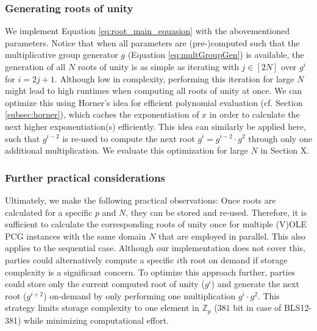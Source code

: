 \subsubsection{Generating roots of unity}
We implement Equation \ref{eq:root_main_equasion} with the abovementioned parameters. Notice that when all parameters are (pre-)computed such that the multiplicative group generator $g$ (Equation \ref{eq:multGroupGen}) is available, the generation of all $N$ roots of unity is as simple as iterating with $j\in[2N]$ over $g^i$ for $i=2j+1$. Although low in complexity, performing this iteration for large $N$ might lead to high runtimes when computing all roots of unity at once. We can optimize this using Horner's idea for efficient polynomial evaluation (cf. Section \ref{subsec:horner}), which caches the exponentiation of $x$ in order to calculate the next higher exponentiation(s) efficiently. This idea can similarly be applied here, such that $g^{i-2}$ is re-used to compute the next root $g^i= g^{i-2}\cdot g^2$ through only one additional multiplication. We evaluate this optimization for large $N$ in Section X.

\subsubsection{Further practical considerations}
Ultimately, we make the following practical observations: Once roots are calculated for a specific $p$ and $N$, they can be stored and re-used. Therefore, it is sufficient to calculate the corresponding roots of unity once for multiple (V)OLE PCG instances with the same domain $N$ that are employed in parallel. This also applies to the sequential case. Although our implementation does not cover this, parties could alternatively compute a specific $i$th root on demand if storage complexity is a significant concern. To optimize this approach further, parties could store only the current computed root of unity ($g^i$) and generate the next root ($g^{i+2}$) on-demand by only performing one multiplication $g^i\cdot g^2$. This strategy limits storage complexity to one element in $\mathbb{Z}_p$ ($381$ bit in case of BLS12-381) while minimizing computational effort. 